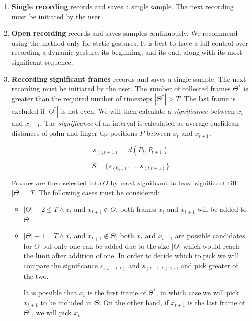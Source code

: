 \begin{enumerate}
	\item \textbf{Single recording} records and saves a single sample. The next recording must be initiated by the user.
    \item \textbf{Open recording} records and saves samples continuously. We recommend using the method only for static gestures. It is best to have a full control over recording a dynamic gesture, its beginning, and its end, along with its most significant sequence.
    \item \textbf{Recording significant frames} records and saves a single sample. The next recording must be initiated by the user. The number of collected frames $\Theta^*$ is greater than the required number of timesteps $|\Theta^*| > T$. The last frame is excluded if $|\Theta^*|$ is not even. We will then calculate a \textit{significance} between $x_t$ and $x_{t+1}$.
    The \textit{significance} of an interval is calculated as average euclidean distances of palm and finger tip positions $P$ between $x_t$ and $x_{t+1}$.

    \begin{equation}
        {s_{(t, t+1)} = d(P_{t}, P_{t+1})}
    \end{equation}

    \begin{equation}
        {S = \{s_{(0, 1)}, ...,s_{(t, t+1)}\}}
    \end{equation}

    Frames are then selected into $\Theta$ by most significant to least significant till $|\Theta| = T$. The following cases must be considered:
    \begin{itemize}
        \item $|\Theta| + 2 \leq T \land x_t$ and $x_{t+1} \notin \Theta$, both frames $x_t$ and $x_{t+1}$ will be added to $\Theta$.
        \item $|\Theta| + 1 = T \land x_t$ and $x_{t+1} \notin \Theta$, both $x_t$ and $x_{t+1}$ are possible candidates for $\Theta$ but only one can be added due to the size $|\Theta|$ which would reach the limit after addition of one. In order to decide which to pick we will compare the significance $s_{(t-1, t)}$ and $s_{(t+1, t+2)}$, and pick greater of the two.
        
        It is possible that $x_t$ is the first frame of $\Theta^*$, in which case we will pick $x_{t+1}$ to be included in $\Theta$. On the other hand, if $x_{t+1}$ is the last frame of $\Theta^*$, we will pick $x_t$.
        

\end{itemize}
\end{enumerate}

